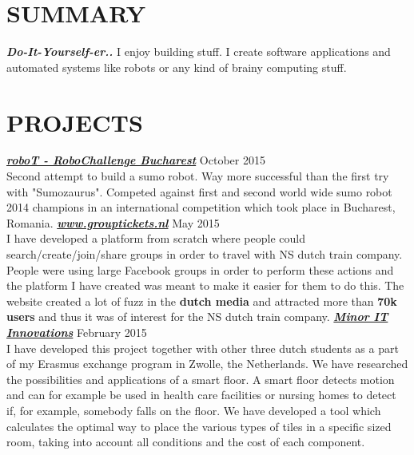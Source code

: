 \documentclass[line,margin]{res}
\begin{document}
\begin{resume}

\section{\color{section} SUMMARY}
\justify
{\color{headings} \large \sl \textbf{Do-It-Yourself-er..}} I enjoy building stuff. I create software applications and automated systems like robots or any kind of brainy computing stuff.

\section{\color{section} PROJECTS} 
\justify
{\color{headings} \large \sl \textbf{\href{https://www.facebook.com/MatrixRobots/}{roboT - RoboChallenge Bucharest}}} {\scriptsize October 2015} \\
Second attempt to build a sumo robot. Way more successful than the first try with "Sumozaurus". Competed against first and second world wide sumo robot 2014 champions in an international competition which took place in Bucharest, Romania.
\vspace{0.2cm}
\newline
{\color{headings}\large \sl \textbf{\url{www.grouptickets.nl}}} {\scriptsize May 2015} \\
I have developed a platform from scratch where people could search/create/join/share groups in order to travel with NS dutch train company. People were using large Facebook groups in order to perform these actions and the platform I have created was meant to make it easier for them to do this. The website created a lot of fuzz in the \textbf{dutch media} and attracted more than \textbf{70k users} and thus it was of interest for the NS dutch train company.
\vspace{0.2cm}
\newline
{\color{headings}\large \sl \textbf{\href{http://www.edelgroup.nl/nl-nl/lisa_detectionfloor_nl}{Minor IT Innovations}}} {\scriptsize February 2015} \\
I have developed this project together with other three dutch students as a part of my Erasmus exchange program in Zwolle, the Netherlands. We have researched the possibilities and applications of a smart floor. A smart floor detects motion and can for example be used in health care facilities or nursing homes to detect if, for example, somebody falls on the floor. We have developed a tool which calculates the optimal way to place the various types of tiles in a specific sized room, taking into account all conditions and the cost of each component.

\end{resume}
\end{document}
